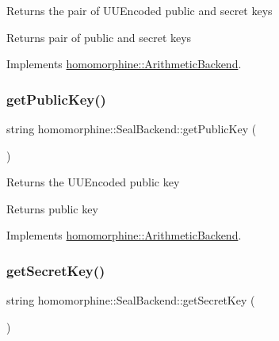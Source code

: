 Returns the pair of U\+U\+Encoded public and secret keys

\begin{DoxyReturn}{Returns}
pair of public and secret keys 
\end{DoxyReturn}


Implements \mbox{\hyperlink{classhomomorphine_1_1_arithmetic_backend_a71bb86054685708001c636e3085d578c}{homomorphine\+::\+Arithmetic\+Backend}}.

\mbox{\label{classhomomorphine_1_1_seal_backend_aa2dce269303eaa73c62dbfacce66dc1a}} 
\subsubsection{\texorpdfstring{getPublicKey()}{getPublicKey()}}
{\footnotesize\ttfamily string homomorphine\+::\+Seal\+Backend\+::get\+Public\+Key (\begin{DoxyParamCaption}{ }\end{DoxyParamCaption})\hspace{0.3cm}{\ttfamily [virtual]}}

Returns the U\+U\+Encoded public key

\begin{DoxyReturn}{Returns}
public key 
\end{DoxyReturn}


Implements \mbox{\hyperlink{classhomomorphine_1_1_arithmetic_backend_a26f31fc0c76cf58636972f68142b9a06}{homomorphine\+::\+Arithmetic\+Backend}}.

\mbox{\label{classhomomorphine_1_1_seal_backend_a8ad57a68eb8a02d162ba439046565471}} 
\subsubsection{\texorpdfstring{getSecretKey()}{getSecretKey()}}
{\footnotesize\ttfamily string homomorphine\+::\+Seal\+Backend\+::get\+Secret\+Key (\begin{DoxyParamCaption}{ }\end{DoxyParamCaption})\hspace{0.3cm}{\ttfamily [virtual]}}

